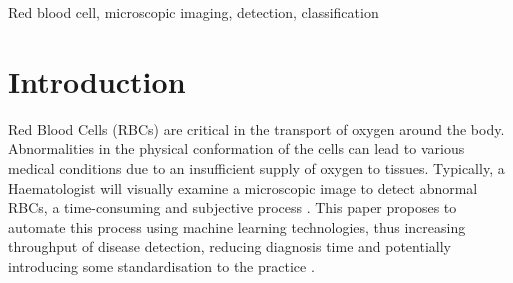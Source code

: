 \documentclass[final,5p,times,twocolumn,authoryear]{elsarticle}
\begin{document}
\begin{frontmatter}
\begin{abstract}
\end{abstract}



\begin{keyword}
Red blood cell, microscopic imaging, detection, classification



\end{keyword}

\end{frontmatter}


\section{Introduction}
\label{sef:intro}

Red Blood Cells (RBCs) are critical in the transport of oxygen around the body. Abnormalities in the physical conformation of the cells can lead to various medical conditions due to an insufficient supply of oxygen to tissues. Typically, a Haematologist will visually examine a microscopic image to detect abnormal RBCs, a time-consuming and subjective process \citep{Hegde2018PeripheralReview,Aime2019StrategicImaging}. This paper proposes to automate this process using machine learning technologies, thus increasing throughput of disease detection, reducing diagnosis time and potentially introducing some standardisation to the practice \citep{Aime2019StrategicImaging}.
\end{document}
